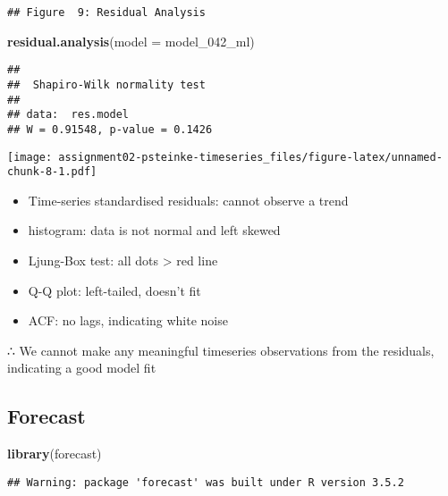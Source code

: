 \documentclass[]{article}
\newenvironment{Shaded}{\begin{snugshade}}{\end{snugshade}}
\newcommand{\DataTypeTok}[1]{\textcolor[rgb]{0.13,0.29,0.53}{#1}}
\newcommand{\DecValTok}[1]{\textcolor[rgb]{0.00,0.00,0.81}{#1}}
\newcommand{\KeywordTok}[1]{\textcolor[rgb]{0.13,0.29,0.53}{\textbf{#1}}}
\newcommand{\NormalTok}[1]{#1}
\newcommand{\OperatorTok}[1]{\textcolor[rgb]{0.81,0.36,0.00}{\textbf{#1}}}
\newcommand{\StringTok}[1]{\textcolor[rgb]{0.31,0.60,0.02}{#1}}
\providecommand{\tightlist}{%
  \setlength{\itemsep}{0pt}\setlength{\parskip}{0pt}}
\begin{document}
\begin{verbatim}
## Figure  9: Residual Analysis
\end{verbatim}

\begin{Shaded}
\begin{Highlighting}[]
\KeywordTok{residual.analysis}\NormalTok{(}\DataTypeTok{model =}\NormalTok{ model_}\DecValTok{042}\NormalTok{_ml)}
\end{Highlighting}
\end{Shaded}

\begin{verbatim}
## 
##  Shapiro-Wilk normality test
## 
## data:  res.model
## W = 0.91548, p-value = 0.1426
\end{verbatim}

\texttt{[image: assignment02-psteinke-timeseries\_files/figure-latex/unnamed-chunk-8-1.pdf]}

\begin{itemize}
\tightlist
\item
  Time-series standardised residuals: cannot observe a trend
\item
  histogram: data is not normal and left skewed
\item
  Ljung-Box test: all dots \textgreater{} red line
\item
  Q-Q plot: left-tailed, doesn't fit
\item
  ACF: no lags, indicating white noise
\end{itemize}

∴ We cannot make any meaningful timeseries observations from the
residuals, indicating a good model fit

\hypertarget{forecast}{%
\subsection{Forecast}\label{forecast}}

\begin{Shaded}
\begin{Highlighting}[]
\KeywordTok{library}\NormalTok{(forecast)}
\end{Highlighting}
\end{Shaded}

\begin{verbatim}
## Warning: package 'forecast' was built under R version 3.5.2
\end{verbatim}

\begin{Shaded}
\end{Shaded}
\end{document}
